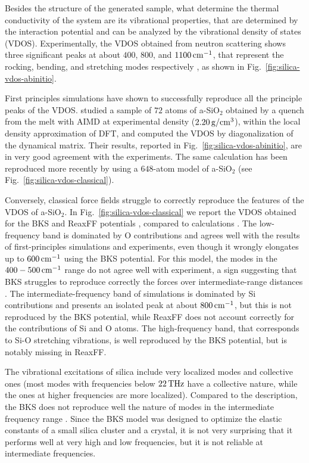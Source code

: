 Besides the structure of the generated sample, what determine the thermal conductivity of the system are its vibrational properties, that are determined by the interaction potential and can be analyzed by the vibrational density of states (VDOS).
Experimentally, the VDOS obtained from neutron scattering shows three significant peaks at about $400$, $800$, and $1100\,\mathrm{cm^{-1}}$, that represent the rocking, bending, and stretching modes respectively \cite{Galeener1983}, as shown in Fig.~\ref{fig:silica-vdos-abinitio}.

First principles simulations have shown to successfully reproduce all the principle peaks of the VDOS. \citet{Sarnthein1997} studied a sample of $72$ atoms of a-SiO$_2$ obtained by a quench from the melt with AIMD at experimental density ($2.20\,\mathrm{g/cm^3}$), within the local density approximation of DFT, and computed the VDOS by diagonalization of the dynamical matrix. Their results, reported in Fig.~\ref{fig:silica-vdos-abinitio}, are in very good agreement with the experiments. The same calculation has been reproduced more recently by \citet{Bhattarai2016} using a $648$-atom model of a-SiO$_2$ (see Fig.~\ref{fig:silica-vdos-classical}). 

Conversely, classical force fields struggle to correctly reproduce the features of the VDOS of a-SiO$_2$. In Fig.~\ref{fig:silica-vdos-classical} we report the VDOS obtained for the BKS and ReaxFF potentials \cite{Tian2017}, compared to \abinitio calculations \cite{Bhattarai2016}. 
The low-frequency band is dominated by O contributions and agrees well with the results of first-principles simulations and experiments, even though it wrongly elongates up to $600\,\mathrm{cm^{-1}}$ using the BKS potential. For this model, the modes in the $400-500\,\mathrm{cm^{-1}}$ range do not agree well with experiment, a sign suggesting that BKS struggles to reproduce correctly the forces over intermediate-range distances \cite{Vollmayr1996,Benoit2002}. 
The intermediate-frequency band of \abinitio simulations is dominated by Si contributions and presents an isolated peak at about $800\,\mathrm{cm^{-1}}$, but this is not reproduced by the BKS potential, while ReaxFF does not account correctly for the contributions of Si and O atoms. 
The high-frequency band, that corresponds to Si-O stretching vibrations, is well reproduced by the BKS potential, but is notably missing in ReaxFF. 

The vibrational excitations of silica include very localized modes and collective ones (most modes with frequencies below $22\,\mathrm{THz}$ have a collective nature, while the ones at higher frequencies are more localized). Compared to the \abinitio description, the BKS does not reproduce well the nature of modes in the intermediate frequency range \cite{Benoit2002}. Since the BKS model was designed to optimize the elastic constants of a small silica cluster and a crystal, it is not very surprising that it performs well at very high and low frequencies, but it is not reliable at intermediate frequencies. 

